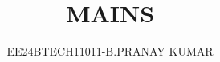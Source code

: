 \documentclass[journal]{IEEEtran}
\begin{document}

\vspace{3cm}

\title{MAINS}
\author{EE24BTECH11011-B.PRANAY KUMAR
}
 \maketitle
{\let\newpage\relax\maketitle}

\renewcommand{\thefigure}{\theenumi}
\renewcommand{\thetable}{\theenumi}
\setlength{\intextsep}{10pt} %


\renewcommand{\thetable}{\theenumi}
\end{document}
